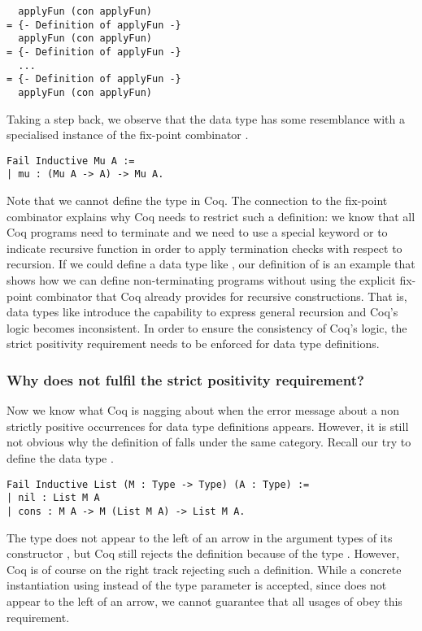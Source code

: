 \begin{verbatim}
  applyFun (con applyFun)
= {- Definition of applyFun -}
  applyFun (con applyFun)
= {- Definition of applyFun -}
  ...
= {- Definition of applyFun -}
  applyFun (con applyFun)
\end{verbatim}

Taking a step back, we observe that the data type
 has some resemblance with a specialised instance
of the fix-point combinator .

\begin{verbatim}
Fail Inductive Mu A :=
| mu : (Mu A -> A) -> Mu A.
\end{verbatim}

Note that we cannot define the type  in Coq.
The connection to the fix-point combinator explains why Coq needs to
restrict such a definition: we know that all Coq programs need to
terminate and we need to use a special keyword  or
 to indicate recursive function in order to apply
termination checks with respect to recursion.
If we could define a data type like , our definition of
 is an example that shows how we can define
non-terminating programs without using the explicit fix-point
combinator that Coq already provides for recursive constructions.
That is, data types like  introduce the capability to express
general recursion and Coq's logic becomes inconsistent.
In order to ensure the consistency of Coq's logic, the strict
positivity requirement needs to be enforced for data type definitions.

\subsubsection{Why does  not fulfil the strict positivity requirement?}

Now we know what Coq is nagging about when the error message about a
non strictly positive occurrences for data type definitions appears.
However, it is still not obvious why the definition of 
falls under the same category.
Recall our try to define the data type .

\begin{verbatim}
Fail Inductive List (M : Type -> Type) (A : Type) :=
| nil : List M A
| cons : M A -> M (List M A) -> List M A.
\end{verbatim}

The type  does not appear to the left of an arrow in the
argument types of its constructor , but Coq still rejects
the definition because of the type .
However, Coq is of course on the right track rejecting such a
definition.
While a concrete instantiation using  instead of the
type parameter  is accepted, since  does not appear
to the left of an arrow, we cannot guarantee that all usages of
 obey this requirement.

